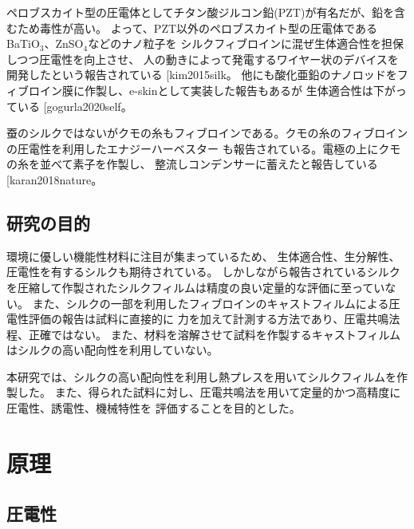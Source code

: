 \documentclass[dvipdfmx,12pt,a4paper]{jreport}
\makeatletter
\DeclareRobustCommand\cite{\unskip
    	\@ifnextchar[{\@tempswatrue\@citex}{\@tempswafalse\@citex[]}}
\makeatother
\begin{document}
			ペロブスカイト型の圧電体としてチタン酸ジルコン鉛(PZT)が有名だが、鉛を含むため毒性が高い。
			よって、PZT以外のペロブスカイト型の圧電体であるBaTiO$_3$、ZnSO$_4$などのナノ粒子を
			シルクフィブロインに混ぜ生体適合性を担保しつつ圧電性を向上させ、
			人の動きによって発電するワイヤー状のデバイスを開発したという報告されている\cite{kim2015silk}。
			他にも酸化亜鉛のナノロッドをフィブロイン膜に作製し、e-skinとして実装した報告もあるが
			生体適合性は下がっている\cite{gogurla2020self}。
			
			蚕のシルクではないがクモの糸もフィブロインである。クモの糸のフィブロインの圧電性を利用したエナジーハーベスター
			も報告されている。電極の上にクモの糸を並べて素子を作製し、
			整流しコンデンサーに蓄えたと報告している\cite{karan2018nature}。

		\section{研究の目的}
		環境に優しい機能性材料に注目が集まっているため、
		生体適合性、生分解性、圧電性を有するシルクも期待されている。
		しかしながら報告されているシルクを圧縮して作製されたシルクフィルムは精度の良い定量的な評価に至っていない。
		また、シルクの一部を利用したフィブロインのキャストフィルムによる圧電性評価の報告は試料に直接的に
		力を加えて計測する方法であり、圧電共鳴法程、正確ではない。
		また、材料を溶解させて試料を作製するキャストフィルムはシルクの高い配向性を利用していない。
		
		本研究では、シルクの高い配向性を利用し熱プレスを用いてシルクフィルムを作製した。
		また、得られた試料に対し、圧電共鳴法を用いて定量的かつ高精度に圧電性、誘電性、機械特性を
		評価することを目的とした。
	\chapter{原理}
		\section{圧電性}
\end{document}
